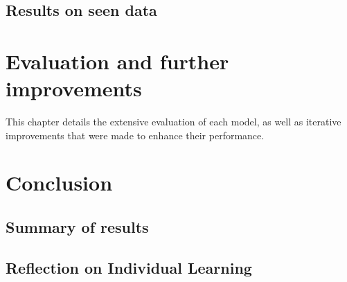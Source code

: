 \documentclass[12pt]{report}
\begin{document}
\section{Results on seen data}

\chapter{Evaluation and further improvements}
This chapter details the extensive evaluation of each model, as well as iterative improvements 
that were made to enhance their performance.


\chapter{Conclusion}
\section{Summary of results} 

\section{Reflection on Individual Learning}


\printbibliography
\end{document}
